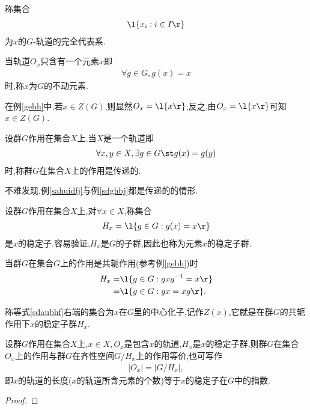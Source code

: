 \begin{definition}[完全代表系]
    称集合\begin{align*}
        \l\{x_i:i\in I\r\}
    \end{align*}为$x$的$G$-轨道的完全代表系.
\end{definition}
\begin{definition}[不动元素]
    当轨道$O_x$只含有一个元素$x$即\begin{align*}
        \forall g\in G,g(x)=x
    \end{align*}时,称$x$为$G$的不动元素.
\end{definition}
在例\ref{gebh}中,若$x\in Z(G)$,则显然$O_x=\l\{x\r\}$;反之,由$O_x=\l\{x\r\}$可知$x\in Z(G)$.
\begin{definition}[传递的]
    设群$G$作用在集合$X$上,当$X$是一个轨道即\begin{align*}
        \forall x,y\in X,\exists g\in G\st g(x)=g(y)
    \end{align*}时,称群$G$在集合$X$上的作用是传递的.
\end{definition}
不难发现,例\ref{sahuidfj}与例\ref{sdghbj}都是传递的的情形.
\begin{definition}[稳定子与稳定子群]
    设群$G$作用在集合$X$上,对$\forall x\in X$,称集合\begin{align*}
        H_x=\l\{g\in G:g(x)=x\r\}
    \end{align*}是$x$的稳定子.容易验证,$H_x$是$G$的子群,因此也称为元素$x$的稳定子群.
\end{definition}
当群$G$在集合$G$上的作用是共轭作用(参考例\ref{gebh})时\begin{align}
    H_x=&\l\{g\in G:gxg^{-1}=x\r\}\nonumber\\
    =&\l\{g\in G:gx=xg\r\}.\label{sdaubhf}
\end{align}
\begin{definition}[中心化子]
    称等式\eqref{sdaubhf}右端的集合为$x$在$G$里的中心化子,记作$Z(x)$,它就是在群$G$的共轭作用下$x$的稳定子群$H_x$.
\end{definition}
\begin{theorem}[轨道-稳定子定理]\label{gdwdzdl}
    设群$G$作用在集合$X$上,$x\in X,O_x$是包含$x$的轨道,$H_x$是$x$的稳定子群,则群$G$在集合$O_x$上的作用与群$G$在齐性空间$G/H_x$上的作用等价,也可写作\begin{align*}
        |O_x|=|G/H_x|,
    \end{align*}即$x$的轨道的长度($x$的轨道所含元素的个数)等于$x$的稳定子在$G$中的指数.
\end{theorem}
\begin{proof}
    \stars
\end{proof}
